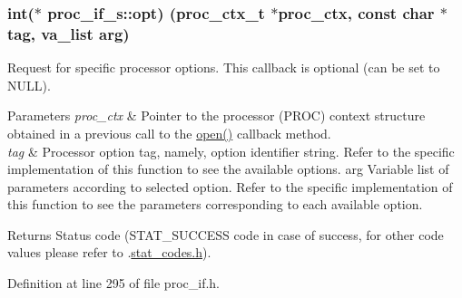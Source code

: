 \subsubsection[{\texorpdfstring{opt}{opt}}]{\setlength{\rightskip}{0pt plus 5cm}int($\ast$ proc\+\_\+if\+\_\+s\+::opt) ({\bf proc\+\_\+ctx\+\_\+t} $\ast$proc\+\_\+ctx, const char $\ast$tag, va\+\_\+list arg)}\hypertarget{structproc__if__s_a4ca0939d6721f368d2560851197fca36}{}\label{structproc__if__s_a4ca0939d6721f368d2560851197fca36}
Request for specific processor options. This callback is optional (can be set to N\+U\+LL). 
\begin{DoxyParams}{Parameters}
{\em proc\+\_\+ctx} & Pointer to the processor (P\+R\+OC) context structure obtained in a previous call to the \textquotesingle{}\hyperlink{structproc__if__s_a34999576771394dfb721463c8455ba06}{open()}\textquotesingle{} callback method. \\
\hline
{\em tag} & Processor option tag, namely, option identifier string. Refer to the specific implementation of this function to see the available options. arg Variable list of parameters according to selected option. Refer to the specific implementation of this function to see the parameters corresponding to each available option. \\
\hline
\end{DoxyParams}
\begin{DoxyReturn}{Returns}
Status code (S\+T\+A\+T\+\_\+\+S\+U\+C\+C\+E\+SS code in case of success, for other code values please refer to .\hyperlink{stat__codes_8h}{stat\+\_\+codes.\+h}). 
\end{DoxyReturn}


Definition at line 295 of file proc\+\_\+if.\+h.

